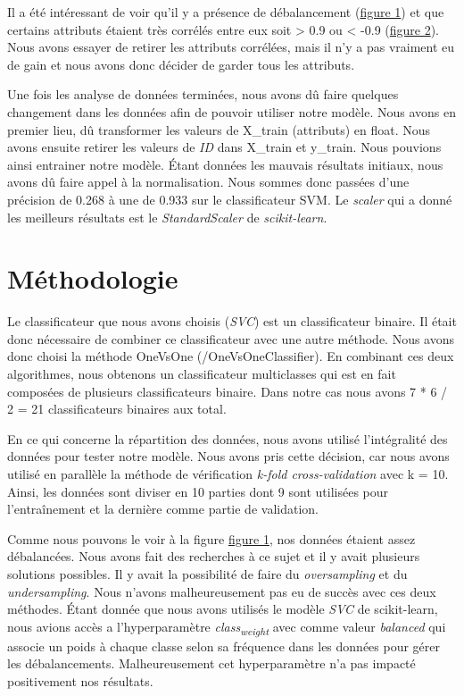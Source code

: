 \documentclass[12pt]{extarticle}
\begin{document}
\vspace{5mm}

Il a été intéressant de voir qu'il y a présence de débalancement (\hyperref[fig:barchart]{figure 1}) et que certains attributs étaient très corrélés entre eux soit > 0.9 ou < -0.9 (\hyperref[fig:heatmap]{figure 2}). Nous avons essayer de retirer les attributs corrélées, mais il n'y a pas vraiment eu de gain et nous avons donc décider de garder tous les attributs.

Une fois les analyse de données terminées, nous avons dû faire quelques changement dans les données afin de pouvoir utiliser notre modèle. Nous avons en premier lieu, dû transformer les valeurs de X\_train (attributs) en float. Nous avons ensuite retirer les valeurs de \emph{ID} dans X\_train et y\_train. Nous pouvions ainsi entrainer notre modèle. Étant données les mauvais résultats initiaux, nous avons dû faire appel à la normalisation. Nous sommes donc passées d'une précision de 0.268 à une de 0.933 sur le classificateur SVM. Le \emph{scaler} qui a donné les meilleurs résultats est le \emph{StandardScaler} de \emph{scikit-learn}.

\section{Méthodologie}
\label{sec:org843d733}
Le classificateur que nous avons choisis (\emph{SVC}) est un classificateur binaire. Il était donc nécessaire de combiner ce classificateur avec une autre méthode. Nous avons donc choisi la méthode OneVsOne (/OneVsOneClassifier). En combinant ces deux algorithmes, nous obtenons un classificateur multiclasses qui est en fait composées de plusieurs classificateurs binaire. Dans notre cas nous avons 7 * 6 / 2 = 21 classificateurs binaires aux total.

En ce qui concerne la répartition des données, nous avons utilisé l'intégralité des données pour tester notre modèle. Nous avons pris cette décision, car nous avons utilisé en parallèle la méthode de vérification \emph{k-fold cross-validation} avec k = 10. Ainsi, les données sont diviser en 10 parties dont 9 sont utilisées pour l'entraînement et la dernière comme partie de validation.

Comme nous pouvons le voir à la figure \hyperref[fig:barchart]{figure 1}, nos données étaient assez débalancées. Nous avons fait des recherches à ce sujet et il y avait plusieurs solutions possibles. Il y avait la possibilité de faire du \emph{oversampling} et du \emph{undersampling}. Nous n'avons malheureusement pas eu de succès avec ces deux méthodes. Étant donnée que nous avons utilisés le modèle \emph{SVC} de scikit-learn, nous avions accès a l'hyperparamètre \emph{class\textsubscript{weight}} avec comme valeur \emph{balanced} qui associe un poids à chaque classe selon sa fréquence dans les données pour gérer les débalancements. Malheureusement cet hyperparamètre n'a pas impacté positivement nos résultats.
\end{document}
